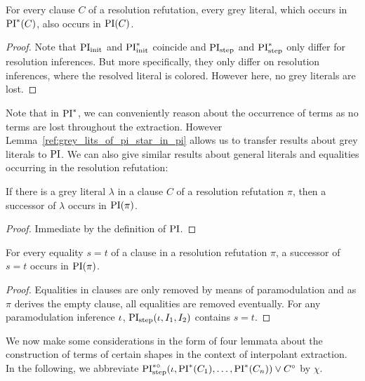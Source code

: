\documentclass[,%
	draft=false,%
	numbers=noendperiod
	12pt,
	a4paper,
	oneside,%
	openany,
]{memoir}
\newcommand{\inv}{\ensuremath{\chi}}
\begin{document}
\begin{lemma}
	\label{lemma:grey_lits_of_pi_star_in_pi}
	For every clause $C$ of a resolution refutation,
	every grey literal, which occurs in $\operatorname{PI}^*(C)$, also occurs in $\operatorname{PI}(C)$.
\end{lemma}
\begin{proof}
	Note that $\operatorname{PI}_{\mathrm{init}}$ and $\operatorname{PI}_{\mathrm{init}}^*$ coincide and $\operatorname{PI}_{\mathrm{step}}$ and $\operatorname{PI}_{\mathrm{step}}^*$ only differ for resolution inferences.
	But more specifically, they only differ on resolution inferences, where the resolved literal is colored. However here, no grey literals are lost.
\end{proof}

Note that in $\operatorname{PI}^*$, we can conveniently reason about the occurrence of terms as no terms are lost throughout the extraction.
However Lemma~\ref{ref:grey_lits_of_pi_star_in_pi} allows us to transfer results about grey literals to $\operatorname{PI}$.
We can also give similar results about general literals and equalities occurring in the resolution refutation:

\begin{lemma}
	\label{lemma:grey_lits_all_in_PI}
	If there is a grey literal $\lambda$ in a clause $C$ of a resolution refutation $\pi$,
	then a successor of $\lambda$ occurs in $\operatorname{PI}(\pi)$.
\end{lemma}
\begin{proof}
	Immediate by the definition of $\operatorname{PI}$.
\end{proof}

\begin{lemma}
	\label{lemma:equalities_all_in_PI}
	For every equality $s=t$ of a clause in a resolution refutation $\pi$,
	a successor of $s=t$ occurs in $\operatorname{PI}(\pi)$.
\end{lemma}
\begin{proof}
	Equalities in clauses are only removed by means of paramodulation and as $\pi$ derives the empty clause, all equalities are removed eventually.
	For any paramodulation inference $\iota$, $\operatorname{PI}_{\mathrm{step}}(\iota, I_1, I_2)$ contains $s=t$.
\end{proof}


We now make some considerations in the form of four lemmata about the construction of terms of certain shapes in the context of interpolant extraction.
In the following, we abbreviate $\operatorname{PI}^{*\circ}_{\mathrm{step}}(\iota, \operatorname{PI}^*(C_1), \dots, \operatorname{PI}^*(C_n)) \lor C^\circ$ by $\inv$.
\end{document}
